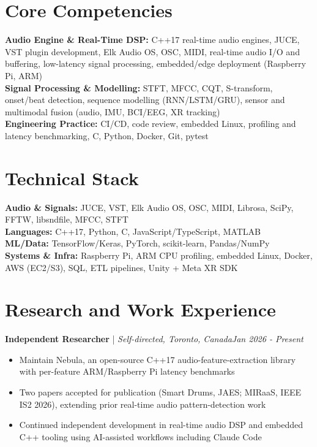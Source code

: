 \documentclass[11pt]{article}
\newenvironment{cvrole}[5]{%
  \par\noindent\textbf{\large #1} | \textit{\small #2, #3}\hfill \textit{\small #4 - #5}\par
  \begin{itemize}[leftmargin=2em, itemsep=-0.3em, topsep=-0.5em]%
}{%
  \end{itemize}\par\noindent\mbox{}\par\vspace{0.1em}%
}
\begin{document}
\section*{Core Competencies}
\textbf{Audio Engine \& Real-Time DSP:} C++17 real-time audio engines, JUCE, VST plugin development, Elk Audio OS, OSC, MIDI, real-time audio I/O and buffering, low-latency signal processing, embedded/edge deployment (Raspberry Pi, ARM) \\
\textbf{Signal Processing \& Modelling:} STFT, MFCC, CQT, S-transform, onset/beat detection, sequence modelling (RNN/LSTM/GRU), sensor and multimodal fusion (audio, IMU, BCI/EEG, XR tracking) \\
\textbf{Engineering Practice:} CI/CD, code review, embedded Linux, profiling and latency benchmarking, C, Python, Docker, Git, pytest

\section*{Technical Stack}
\textbf{Audio \& Signals:} JUCE, VST, Elk Audio OS, OSC, MIDI, Librosa, SciPy, FFTW, libsndfile, MFCC, STFT \\
\textbf{Languages:} C++17, Python, C, JavaScript/TypeScript, MATLAB \\
\textbf{ML/Data:} TensorFlow/Keras, PyTorch, scikit-learn, Pandas/NumPy \\
\textbf{Systems \& Infra:} Raspberry Pi, ARM CPU profiling, embedded Linux, Docker, AWS (EC2/S3), SQL, ETL pipelines, Unity + Meta XR SDK

\section*{Research and Work Experience}

\begin{cvrole}{Independent Researcher}{Self-directed}{Toronto, Canada}{Jan 2026}{Present}
    \item Maintain Nebula, an open-source C++17 audio-feature-extraction library with per-feature ARM/Raspberry Pi latency benchmarks
    \item Two papers accepted for publication (Smart Drums, JAES; MIRaaS, IEEE IS2 2026), extending prior real-time audio pattern-detection work
    \item Continued independent development in real-time audio DSP and embedded C++ tooling using AI-assisted workflows including Claude Code
\end{cvrole}
\end{document}

